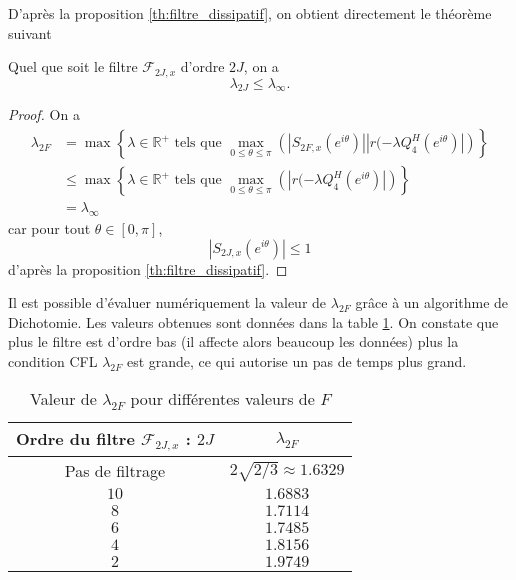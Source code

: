 D'après la proposition \ref{th:filtre_dissipatif}, on obtient directement le théorème suivant
\begin{theoreme}
Quel que soit le filtre $\mathcal{F}_{2J,x}$ d'ordre $2J$, on a 
\begin{equation}
\lambda_{2J} \leq \lambda_{\infty}.
\end{equation}
\end{theoreme}

\begin{proof}
On a 
\begin{align*}
\lambda_{2F} & = \max \left\lbrace \lambda \in \mathbb{R}^+ \text{ tels que } \max_{0 \leq \theta \leq \pi} \left(|S_{2F,x}(e^{i \theta})| | r(-\lambda Q_4^H(e^{i \theta}) | \right) \right\rbrace \\
		& \leq \max \left\lbrace \lambda \in \mathbb{R}^+ \text{ tels que } \max_{0 \leq \theta \leq \pi} \left(| r(-\lambda Q_4^H(e^{i \theta}) | \right) \right\rbrace\\
		& = \lambda_{\infty}
\end{align*}
car pour tout $\theta \in [0, \pi]$, 
\begin{equation}
|S_{2J,x}(e^{i \theta})| \leq 1
\end{equation}
d'après la proposition \ref{th:filtre_dissipatif}.
\end{proof}

Il est possible d'évaluer numériquement la valeur de $\lambda_{2F}$ grâce à un algorithme de Dichotomie. Les valeurs obtenues sont données dans la table \ref{tab:cfl_adv1d}. On constate que plus le filtre est d'ordre bas (il affecte alors beaucoup les données) plus la condition CFL $\lambda_{2F}$ est grande, ce qui autorise un pas de temps plus grand.

\begin{table}[htbp]
\begin{center}
\begin{tabular}{|c|c|}
\hline
\textbf{Ordre du filtre} $\mathcal{F}_{2J,x}$ : $2J$ & $\lambda_{2F}$ \\
\hline
\hline
Pas de filtrage & $2 \sqrt{2/3} \approx 1.6329$ \\
$10$ & $1.6883$ \\
$ 8$ & $1.7114$ \\
$ 6$ & $1.7485$ \\
$ 4$ & $1.8156$ \\
$ 2$ & $1.9749$ \\
\hline
\end{tabular}
\end{center}
\caption{Valeur de $\lambda_{2F}$ pour différentes valeurs de $F$}
\label{tab:cfl_adv1d}
\end{table}













